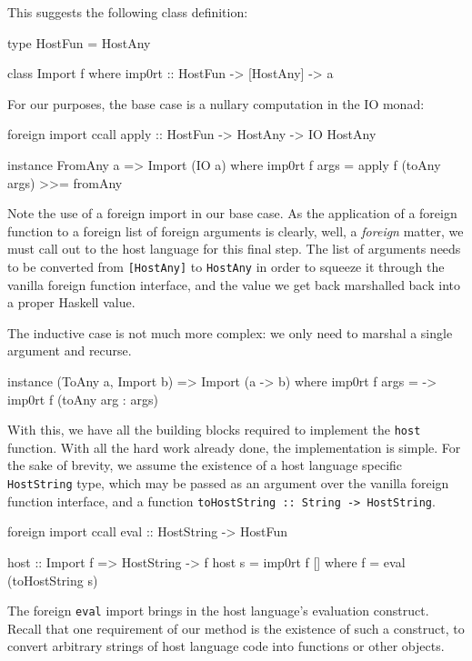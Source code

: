\documentclass{sigplanconf}
\begin{document}
This suggests the following class definition:

\begin{code}
  type HostFun = HostAny

  class Import f where
    imp0rt :: HostFun -> [HostAny] -> a
\end{code}

For our purposes, the base case is a nullary computation in the IO monad:

\begin{code}
  foreign import ccall
    apply :: HostFun -> HostAny -> IO HostAny

  instance FromAny a => Import (IO a) where
    imp0rt f args =
      apply f (toAny args) >>= fromAny
\end{code}

Note the use of a foreign import in our base case. As the application of a
foreign function to a foreign list of foreign arguments is clearly, well, a
\emph{foreign} matter, we must call out to the host language for this final
step.
The list of arguments needs to be converted from \lstinline![HostAny]! to
\lstinline!HostAny! in order to squeeze it through the vanilla foreign
function interface, and the value we get back marshalled back into a proper
Haskell value.

The inductive case is not much more complex: we only need to marshal a single
argument and recurse.

\begin{code}
  instance (ToAny a, Import b) =>
           Import (a -> b) where
    imp0rt f args =
      \arg -> imp0rt f (toAny arg : args)
\end{code}

With this, we have all the building blocks required to implement the
\lstinline!host! function. With all the hard work already done, the
implementation is simple. For the sake of brevity, we assume the
existence of a host language specific \lstinline!HostString! type, which may
be passed as an argument over the vanilla foreign function interface, and a
function \lstinline!toHostString :: String -> HostString!.

\begin{code}
  foreign import ccall
    eval :: HostString -> HostFun

  host :: Import f => HostString -> f
  host s = imp0rt f []
    where
      f = eval (toHostString s)
\end{code}

The foreign \lstinline!eval! import brings in the host language's evaluation
construct. Recall that one requirement of our method is the existence of such
a construct, to convert arbitrary strings of host language code into functions
or other objects.
\end{document}
